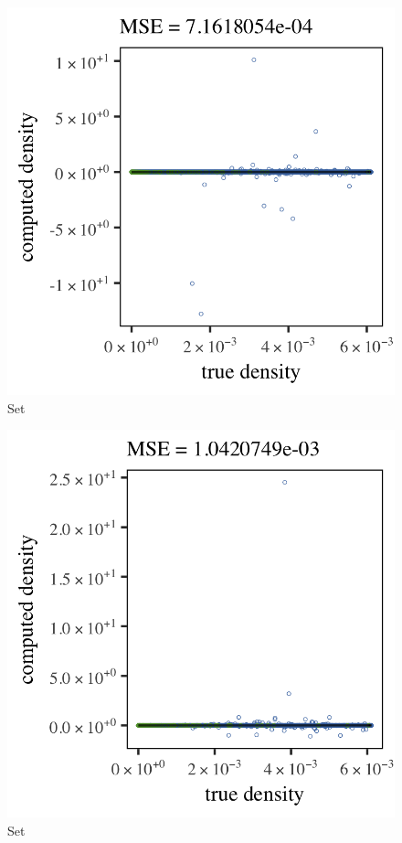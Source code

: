 \begin{subfigure}{0.3\textwidth}
	\centering
	\includegraphics[keepaspectratio=true, width=\textwidth, height=0.23\textheight]{4/img/results_baakman_4_600000_sambe_breiman}
	\caption{Set \baakmanFour}
	\label{fig:4:simulated:datasets:sambe:baakman4}
\end{subfigure}	
\begin{subfigure}{0.3\textwidth}
	\centering
	\includegraphics[keepaspectratio=true, width=\textwidth, height=0.23\textheight]{4/img/results_baakman_5_600000_sambe_breiman}
	\caption{Set \baakmanFive}
	\label{fig:4:simulated:datasets:sambe:baakman5}
\end{subfigure}		
